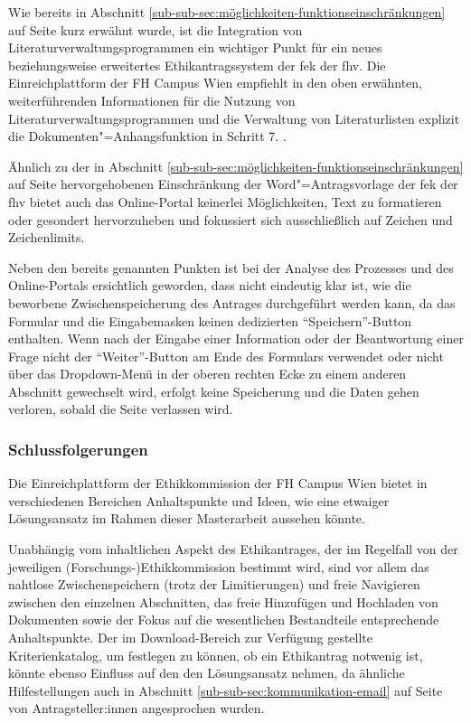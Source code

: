 \documentclass[a4paper,12pt,twoside]{scrreprt}
\begin{document}
\medskip

Wie bereits in Abschnitt \ref{sub-sub-sec:möglichkeiten-funktionseinschränkungen} auf Seite \pageref{sub-sub-sec:möglichkeiten-funktionseinschränkungen} kurz erwähnt wurde, ist die Integration von Literaturverwaltungsprogrammen ein wichtiger Punkt für ein neues beziehungsweise erweitertes Ethikantragssystem der \acl{fek} der \acl{fhv}. Die Einreichplattform der FH Campus Wien empfiehlt in den oben erwähnten, weiterführenden Informationen für die Nutzung von Literaturverwaltungsprogrammen und die Verwaltung von Literaturlisten explizit die Dokumenten"=Anhangsfunktion in Schritt 7. \cite[5]{ethikkommission_fh_campus_wien_wissenswertes_2022}.

\medskip

Ähnlich zu der in Abschnitt \ref{sub-sub-sec:möglichkeiten-funktionseinschränkungen} auf Seite \pageref{sub-sub-sec:möglichkeiten-funktionseinschränkungen} hervorgehobenen Einschränkung der Word"=Antragsvorlage der \ac{fek} der \ac{fhv} bietet auch das Online-Portal keinerlei Möglichkeiten, Text zu formatieren oder gesondert hervorzuheben und fokussiert sich ausschließlich auf Zeichen und Zeichenlimits.

\medskip

Neben den bereits genannten Punkten ist bei der Analyse des Prozesses und des Online-Portals ersichtlich geworden, dass nicht eindeutig klar ist, wie die beworbene Zwischenspeicherung des Antrages durchgeführt werden kann, da das Formular und die Eingabemasken keinen dedizierten \enquote{Speichern}-Button enthalten. Wenn nach der Eingabe einer Information oder der Beantwortung einer Frage nicht der \enquote{Weiter}-Button am Ende des Formulars verwendet oder nicht über das Dropdown-Menü in der oberen rechten Ecke zu einem anderen Abschnitt gewechselt wird, erfolgt keine Speicherung und die Daten gehen verloren, sobald die Seite verlassen wird.

\subsubsection*{Schlussfolgerungen}
\label{sub-sub-sec:schlussfolgerungen-fhcw}

Die Einreichplattform der Ethikkommission der FH Campus Wien bietet in verschiedenen Bereichen Anhaltspunkte und Ideen, wie eine etwaiger Lösungsansatz im Rahmen dieser Masterarbeit aussehen könnte.

Unabhängig vom inhaltlichen Aspekt des Ethikantrages, der im Regelfall von der jeweiligen (Forschungs-)Ethikkommission bestimmt wird, sind vor allem das nahtlose Zwischenspeichern (trotz der Limitierungen) und freie Navigieren zwischen den einzelnen Abschnitten, das freie Hinzufügen und Hochladen von Dokumenten sowie der Fokus auf die wesentlichen Bestandteile entsprechende Anhaltspunkte. Der im Download-Bereich zur Verfügung gestellte Kriterienkatalog, um festlegen zu können, ob ein Ethikantrag notwenig ist, könnte ebenso Einfluss auf den den Lösungsansatz nehmen, da ähnliche Hilfestellungen auch in Abschnitt \ref{sub-sub-sec:kommunikation-email} auf Seite \pageref{sub-sub-sec:kommunikation-email} von Antragsteller:innen angesprochen wurden.
\end{document}
